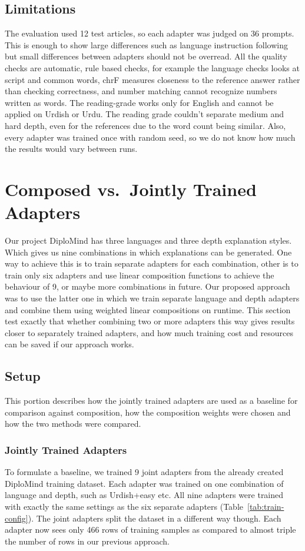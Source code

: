 \documentclass{FastFyp}
\begin{document}
\subsection{Limitations}
The evaluation used 12 test articles, so each adapter was judged on 36 prompts. This is enough to show large differences such as language instruction following but small differences between adapters should not be overread. All the quality checks are automatic, rule based checks, for example the language checks looks at script and common words, chrF measures closeness to the reference answer rather than checking correctness, and number matching cannot recognize numbers written as words. The reading-grade works only for English and cannot be applied on Urdish or Urdu. The reading grade couldn't separate medium and hard depth, even for the references due to the word count being similar. Also, every adapter was trained once with random seed, so we do not know how much the results would vary between runs.

\section{Composed vs.\ Jointly Trained Adapters}
\label{sec:composed-vs-joint}
Our project DiploMind has three languages and three depth explanation styles. Which gives us nine combinations in which explanations can be generated. One way to achieve this is to train separate adapters for each combination, other is to train only six adapters and use linear composition functions to achieve the behaviour of 9, or maybe more combinations in future. Our proposed approach was to use the latter one in which we train separate language and depth adapters and combine them using weighted linear compositions on runtime. This section test exactly that whether combining two or more adapters this way gives results closer to separately trained adapters, and how much training cost and resources can be saved if our approach works.

\subsection{Setup}
This portion describes how the jointly trained adapters are used as a baseline for comparison against composition, how the composition weights were chosen and how the two methods were compared.

\subsubsection{Jointly Trained Adapters}
To formulate a baseline, we trained 9 joint adapters from the already created DiploMind training dataset. Each adapter was trained on one combination of language and depth, such as Urdish+easy etc. All nine adapters were trained with exactly the same settings as the six separate adapters (Table~\ref{tab:train-config}). The joint adapters split the dataset in a different way though. Each adapter now sees only 466 rows of training samples as compared to almost triple the number of rows in our previous approach.
\end{document}
